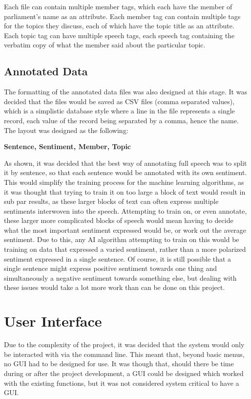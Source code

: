 Each file can contain multiple member tags, which each have the member of parliament’s name as an attribute. Each member tag can contain multiple tags for the topics they discuss, each of which have the topic title as an attribute. Each topic tag can have multiple speech tags, each speech tag containing the verbatim copy of what the member said about the particular topic.

\subsection{Annotated Data}
\label{sec:des_anotate_data}
The formatting of the annotated data files was also designed at this stage. It was decided that the files would be saved as CSV files (comma separated values), which is a simplistic database style where a line in the file represents a single record, each value of the record being separated by a comma, hence the name. The layout was designed as the following:

\textbf{Sentence, Sentiment, Member, Topic}

As shown, it was decided that the best way of annotating full speech was to split it by sentence, so that each sentence would be annotated with its own sentiment. This would simplify the training process for the machine learning algorithms, as it was thought that trying to train it on too large a block of text would result in sub par results, as these larger blocks of text can often express multiple sentiments interwoven into the speech. Attempting to train on, or even annotate, these larger more complicated blocks of speech would mean having to decide what the most important sentiment expressed would be, or work out the average sentiment. Due to this, any AI algorithm attempting to train on this would be training on data that expressed a varied sentiment, rather than a more polarized sentiment expressed in a single sentence. Of course, it is still possible that a single sentence might express positive sentiment towards one thing and simultaneously a negative sentiment towards something else, but dealing with these issues would take a lot more work than can be done on this project. 

\section{User Interface}
\label{sec:des_user_interface}
Due to the complexity of the project, it was decided that the system would only be interacted with via the command line. This meant that, beyond basic menus, no GUI had to be designed for use. It was though that, should there be time during or after the project development, a GUI could be designed which worked with the existing functions, but it was not considered system critical to have a GUI.

